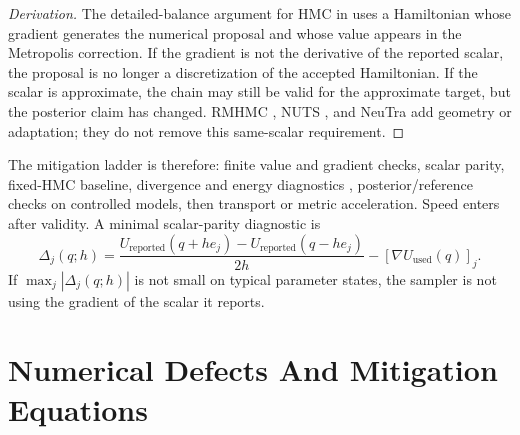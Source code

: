 \begin{proof}[Derivation]
The detailed-balance argument for HMC in \citet{neal2011mcmc} uses a
Hamiltonian whose gradient generates the numerical proposal and whose value
appears in the Metropolis correction.  If the gradient is not the derivative of
the reported scalar, the proposal is no longer a discretization of the accepted
Hamiltonian.  If the scalar is approximate, the chain may still be valid for
the approximate target, but the posterior claim has changed.  RMHMC
\citep{girolami2011riemann}, NUTS \citep{hoffman2014nuts}, and NeuTra
\citep{hoffman2019neutra} add geometry or adaptation; they do not remove this
same-scalar requirement.
\end{proof}

The mitigation ladder is therefore: finite value and gradient checks, scalar
parity, fixed-HMC baseline, divergence and energy diagnostics
\citep{betancourt2017conceptual}, posterior/reference checks on controlled
models, then transport or metric acceleration.  Speed enters after validity.
A minimal scalar-parity diagnostic is
\[
  \Delta_j(q;h)=
  \frac{U_{\mathrm{reported}}(q+h e_j)-U_{\mathrm{reported}}(q-h e_j)}{2h}
  -[\nabla U_{\mathrm{used}}(q)]_j .
\]
If \(\max_j|\Delta_j(q;h)|\) is not small on typical parameter states, the
sampler is not using the gradient of the scalar it reports.

\section{Numerical Defects And Mitigation Equations}
\label{sec:bf-hd-numerical-defects}

